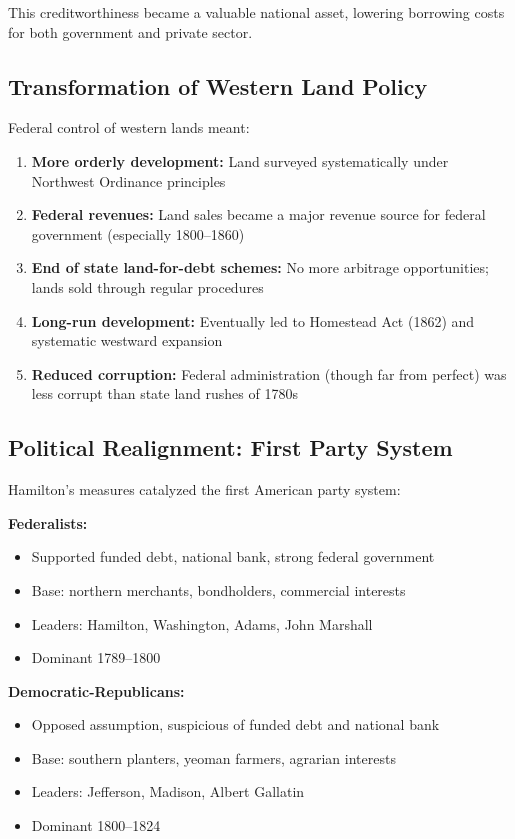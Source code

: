 \documentclass[12pt]{article}
\begin{document}
This creditworthiness became a valuable national asset, lowering borrowing costs for both government and private sector.

\subsection{Transformation of Western Land Policy}

Federal control of western lands meant:

\begin{enumerate}
\item \textbf{More orderly development:} Land surveyed systematically under Northwest Ordinance principles

\item \textbf{Federal revenues:} Land sales became a major revenue source for federal government (especially 1800--1860)

\item \textbf{End of state land-for-debt schemes:} No more arbitrage opportunities; lands sold through regular procedures

\item \textbf{Long-run development:} Eventually led to Homestead Act (1862) and systematic westward expansion

\item \textbf{Reduced corruption:} Federal administration (though far from perfect) was less corrupt than state land rushes of 1780s
\end{enumerate}

\subsection{Political Realignment: First Party System}

Hamilton's measures catalyzed the first American party system:

\textbf{Federalists:}
\begin{itemize}
\item Supported funded debt, national bank, strong federal government
\item Base: northern merchants, bondholders, commercial interests
\item Leaders: Hamilton, Washington, Adams, John Marshall
\item Dominant 1789--1800
\end{itemize}

\textbf{Democratic-Republicans:}
\begin{itemize}
\item Opposed assumption, suspicious of funded debt and national bank
\item Base: southern planters, yeoman farmers, agrarian interests
\item Leaders: Jefferson, Madison, Albert Gallatin
\item Dominant 1800--1824
\end{itemize}
\end{document}
